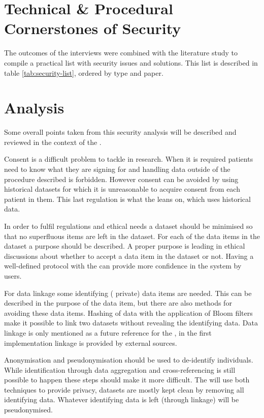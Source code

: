 \section{Technical \& Procedural Cornerstones of Security}
\label{security-summarisation}

The outcomes of the interviews were combined with the literature study to compile a practical list with security issues and solutions.
This list is described in table \ref{tab:security-list}, ordered by type and paper.



\section{Analysis}
\label{security-summarisation-subsub}

Some overall points taken from this security analysis will be described and reviewed in the context of the \ivfsystem{}.

Consent is a difficult problem to tackle in research.
When it is required patients need to know what they are signing for and handling data outside of the procedure described is forbidden.
However consent can be avoided by using historical datasets for which it is unreasonable to acquire consent from each patient in them.
This last regulation is what the \ivfsystem{} leans on, which uses historical data.

In order to fulfil regulations and ethical needs a dataset should be minimised so that no superfluous items are left in the dataset.
For each of the data items in the dataset a purpose should be described. 
A proper purpose is leading in ethical discussions about whether to accept a data item in the dataset or not.
Having a well-defined protocol with the \ivfsystem{} can provide more confidence in the system by users.

For data linkage some identifying (\ie{} private) data items are needed.
This can be described in the purpose of the data item, but there are also methods for avoiding these data items.
Hashing of data with the application of Bloom filters make it possible to link two datasets without revealing the identifying data.
Data linkage is only mentioned as a future reference for the \ivfsystem{}, in the first implementation linkage is provided by external sources.

Anonymisation and pseudonymisation should be used to de-identify individuals.
While identification through data aggregation and cross-referencing is still possible to happen these steps should make it more difficult.
The \ivfsystem{} will use both techniques to provide privacy, datasets are mostly kept clean by removing all identifying data.
Whatever identifying data is left (through linkage) will be pseudonymised.

